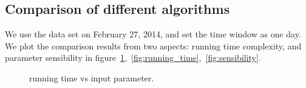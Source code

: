 \subsection{Comparison of different algorithms}
We use the data set on February 27, 2014, and set the time window as one day. We plot the comparison results from two aspects:  running time complexity, and parameter sensibility in figure~\ref{fig:performance},~\ref{fig:running_time},~\ref{fig:sensibility}.
\begin{figure}[h]
	\centering
	\vspace{-1em}
	\caption{running time vs input parameter.}
	\label{fig:performance}
\end{figure}
